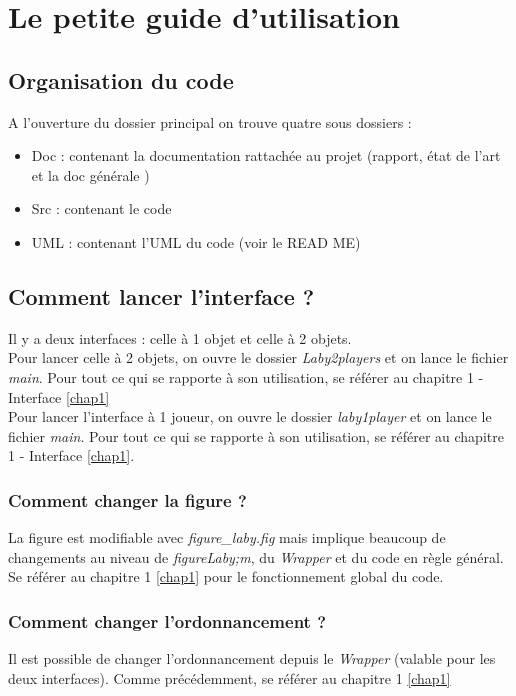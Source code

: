 \chapter{Le petite guide d'utilisation}

\section{Organisation du code}
A l'ouverture du dossier principal on trouve quatre sous dossiers :

\begin{itemize}
\item Doc : contenant la documentation rattachée au projet (rapport, état de l'art et la doc générale )
\item Src : contenant le code
\item UML : contenant l'UML du code (voir le READ ME)
\end{itemize}

\section{Comment lancer l'interface ?}
Il y a deux interfaces : celle à 1 objet et celle à 2 objets.\\
Pour lancer celle à 2 objets, on ouvre le dossier \emph{Laby2players} et on lance le fichier \emph{main}. Pour tout ce qui se rapporte à son utilisation, se référer au chapitre 1 - Interface \ref{chap1}\\
Pour lancer l'interface à 1 joueur, on ouvre le dossier \emph{laby1player} et on lance le fichier \emph{main}. Pour tout ce qui se rapporte à son utilisation, se référer au chapitre 1 - Interface \ref{chap1}.

\subsection{Comment changer la figure ?}
La figure est modifiable avec \emph{figure\_laby.fig} mais implique beaucoup de changements au niveau de \emph{figureLaby;m}, du \emph{Wrapper} et du code en règle général. Se référer au chapitre 1 \ref{chap1} pour le fonctionnement global du code.

\subsection{Comment changer l'ordonnancement ?}
Il est possible de changer l'ordonnancement depuis le \emph{Wrapper} (valable pour les deux interfaces). Comme précédemment, se référer au chapitre 1 \ref{chap1}

